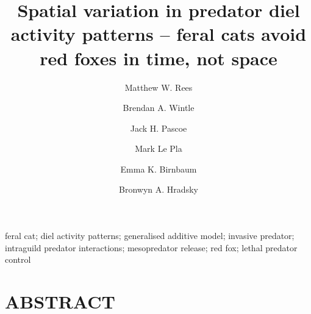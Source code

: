 \documentclass[]{elsarticle} %
\begin{document}
\begin{frontmatter}

  \title{Spatial variation in predator diel activity patterns -- feral cats avoid red foxes in time, not space}
    \author[UOM]{Matthew W. Rees}
    \author[UOM]{Brendan A. Wintle}
  
    \author[CEC]{Jack H. Pascoe}
  
    \author[CEC]{Mark Le Pla}
  
    \author[CEC]{Emma K. Birnbaum}
  
    \author[UOM]{Bronwyn A. Hradsky}
  
      \address[UOM]{Quantitative \& Applied Ecology Group, School of Ecosystem and Forest Science, The University of Melbourne, Parkville, VIC, Australia}
    \address[CEC]{Conservation Ecology Centre, Otway Lighthouse Rd, Cape Otway, VIC, Australia}
  
  \begin{abstract}
  
  \end{abstract}
   \begin{keyword} feral cat; diel activity patterns; generalised additive model; invasive predator; intraguild predator interactions; mesopredator release; red fox; lethal predator control\end{keyword}
 \end{frontmatter}

\parskip=12pt

\newpage

\linenumbers

\hypertarget{abstract}{%
\section*{ABSTRACT}\label{abstract}}
\end{document}
